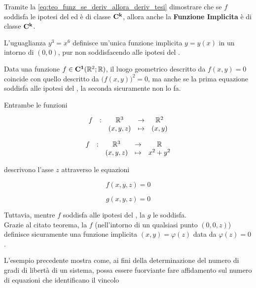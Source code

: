\begin{exercise}
	\label{ex:funz_impl_diff_k}
	Tramite la \cref{eq:teo_funz_se_deriv_allora_deriv_tesi} dimostrare che se $f$ soddisfa le ipotesi del  ed è di classe $\mathbf{C^{k}}$, allora anche la \textbf{Funzione Implicita} è di classe $\mathbf{C^{k}}$.
\end{exercise}
\begin{example}
	L'uguaglianza $y^3 = x^6$ definisce un'unica funzione implicita $y = y(x)$ in un intorno di $(0,0)$, pur non soddisfacendo alle ipotesi del .
\end{example}
\begin{example}
	Data una funzione $f \in \mathbf{C^{1}}(\mathbb{R}^2;\mathbb{R})$, il luogo geometrico descritto da $f(x,y) = 0$ coincide con quello descritto da $\bigl( f(x,y) \bigr)^2 = 0$, ma anche se la prima equazione soddisfa alle ipotesi del , la seconda sicuramente non lo fa.
\end{example}
\begin{example}
	Entrambe le funzioni

	\vspace*{\baselineskip}
	\begin{minipage}{0.48\linewidth}
		\[\begin{array}{ccccc} {f} & : & {\mathbb{R}^3} & \to & {\mathbb{R}^2} \\ & & {(x,y,z)} & \mapsto & {(x,y)} \\ \end{array}\]
	\end{minipage}
	\begin{minipage}{0.48\linewidth}
		\[\begin{array}{ccccc} {f} & : & {\mathbb{R}^3} & \to & {\mathbb{R}} \\ & & {(x,y,z)} & \mapsto & {x^2+y^2} \\ \end{array}\]
	\end{minipage}

	\vspace*{\baselineskip}
	\noindent descrivono l'asse $z$ attraverso le equazioni

	\vspace*{\baselineskip}
	\begin{minipage}{0.48\linewidth}
		\[f(x,y,z) = 0\]
	\end{minipage}
	\begin{minipage}{0.48\linewidth}
		\[g(x,y,z) = 0\]
	\end{minipage}

	\vspace*{\baselineskip}
	\noindent Tuttavia, mentre $f$ soddisfa alle ipotesi del , la $g$ le soddisfa.\\
	Grazie al citato teorema, la $f$ (nell'intorno di un qualsiasi punto $(0,0,z)$) definisce sicuramente una funzione implicita $(x,y) = \varphi(z)$ data da $\varphi(z) = 0$.
	\begin{note}
		L'esempio precedente mostra come, ai fini della determinazione del numero di gradi di libertà di un sistema, possa essere fuorviante fare affidamento sul numero di equazioni che identificano il vincolo
	\end{note}
\end{example}
